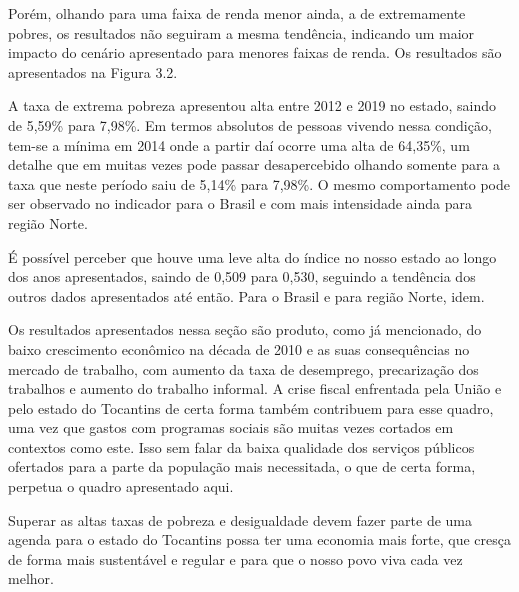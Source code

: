 \par Porém, olhando para uma faixa de renda menor ainda, a de extremamente pobres, os resultados não seguiram a mesma tendência, indicando um maior impacto do cenário apresentado para menores faixas de renda. Os resultados são apresentados na Figura 3.2.
\par A taxa de extrema pobreza apresentou alta entre 2012 e 2019 no estado, saindo de 5,59\% para 7,98\%. Em termos absolutos de pessoas vivendo nessa condição, tem-se a mínima em 2014 onde a partir daí ocorre uma alta de 64,35\%, um detalhe que em muitas vezes pode passar desapercebido olhando somente para a taxa que neste período saiu de 5,14\% para 7,98\%. O mesmo comportamento pode ser observado no indicador para o Brasil e  com mais intensidade ainda para região Norte.

\par É possível perceber que houve uma leve alta do índice no nosso estado ao longo dos anos apresentados, saindo de 0,509 para 0,530, seguindo a tendência dos outros dados apresentados até então. Para o Brasil e para região Norte, idem. 
\par Os resultados apresentados nessa seção são produto, como já mencionado, do baixo crescimento econômico na década de 2010 e as suas consequências no mercado de trabalho, com aumento da taxa de desemprego, precarização dos trabalhos e aumento do trabalho informal. A crise fiscal enfrentada pela União e pelo estado do Tocantins de certa forma também contribuem para esse quadro, uma vez que gastos com programas sociais são muitas vezes cortados em contextos como este. Isso sem falar da baixa qualidade dos serviços públicos ofertados para a parte da população mais necessitada, o que de certa forma, perpetua o quadro apresentado aqui.
\par Superar as altas taxas de pobreza e desigualdade devem fazer parte de uma agenda para o estado do Tocantins possa ter uma economia mais forte, que cresça de forma mais sustentável e regular e para que o nosso povo viva cada vez melhor.

